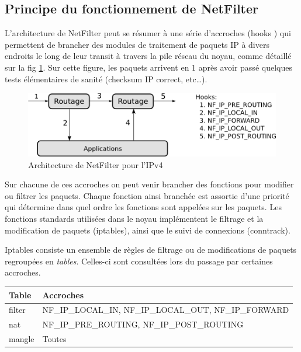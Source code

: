 \subsection{Principe du fonctionnement de NetFilter}

L'architecture de NetFilter peut se résumer à une série d'accroches
(\og hooks \fg{}) qui permettent de brancher des modules de traitement de
paquets IP à divers endroits le long de leur transit à travers la pile
réseau du noyau, comme détaillé sur la fig \ref{NF}. Sur cette figure,
les paquets arrivent en 1 après avoir passé quelques tests
élémentaires de sanité (checksum IP correct, etc\ldots).

\begin{figure}[h]
  \begin{center}
    \includegraphics{netfilter.png}
    \caption{Architecture de NetFilter pour l'IPv4}
    \label{NF}
  \end{center}
\end{figure}

Sur chacune de ces accroches on peut venir brancher des fonctions pour
modifier ou filtrer les paquets. Chaque fonction ainsi branchée est
assortie d'une priorité qui détermine dans quel ordre les fonctions
sont appelées sur les paquets. Les fonctions standards utilisées dans
le noyau implémentent le filtrage et la modification de paquets
(iptables), ainsi que le suivi de connexions (conntrack).

Iptables consiste un ensemble de règles de filtrage ou de modifications
de paquets regroupées en \textit{tables}. Celles-ci sont consultées
lors du passage par certaines accroches.

\begin{center}
  \begin{tabular}{|l|l|}
    \hline
    \textbf{Table} & \textbf{Accroches} \\
    \hline
    filter & NF\_IP\_LOCAL\_IN, NF\_IP\_LOCAL\_OUT, NF\_IP\_FORWARD \\
    \hline
    nat & NF\_IP\_PRE\_ROUTING, NF\_IP\_POST\_ROUTING \\
    \hline
    mangle & Toutes \\
    \hline
  \end{tabular}
\end{center}

